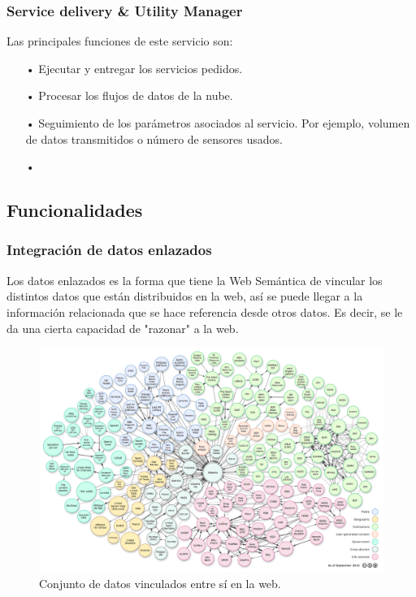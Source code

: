 \documentclass[12pt, twoside]{book}
\begin{document}
\subsubsection{Service delivery \& Utility Manager}
Las principales funciones de este servicio son:
\begin{itemize}
\item[•] Ejecutar y entregar los servicios pedidos.
\item[•] Procesar los flujos de datos de la nube.
\item[•] Seguimiento de los parámetros asociados al servicio. Por ejemplo, volumen de datos transmitidos o número de sensores usados.
\item[•] 
\end{itemize} 	
\subsection{Funcionalidades}

\subsubsection{Integración de datos enlazados}

Los datos enlazados es la forma que tiene la Web Semántica de vincular los distintos datos que están distribuidos en la web, así se puede llegar a la información relacionada que se hace referencia desde otros datos. Es decir, se le da una cierta capacidad de "razonar" a la web.
\begin{figure}[H]
\centering
\includegraphics[scale=0.2]{images/linked_data}
\caption{Conjunto de datos vinculados entre sí en la web.}\label{L303}
\end{figure}
\end{document}
